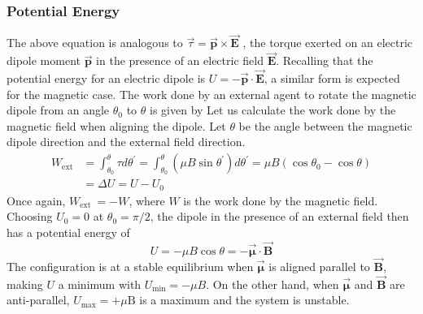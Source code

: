 \subsubsection{Potential Energy}
The above equation is analogous to $\vec{\tau}=\overrightarrow{\mathbf{p}} \times \overrightarrow{\mathbf{E}}$ , the torque exerted on an electric dipole moment $\overrightarrow{\mathbf{p}}$ in the presence of an electric field $\overrightarrow{\mathbf{E}}$. Recalling that the potential energy for an electric dipole is $U=-\overrightarrow{\mathbf{p}} \cdot \overrightarrow{\mathbf{E}}$, a similar form is expected for the magnetic case. The work done by an external agent to rotate the magnetic dipole from an angle $\theta_{0}$ to $\theta$ is given by
Let us calculate the work done by the magnetic field when aligning the dipole. Let $\theta$ be the angle between the magnetic dipole direction and the external field direction.\\
\begin{align*}
	W_{\mathrm{ext}} &=\int_{\theta_{0}}^{\theta} \tau d \theta^{\prime}=\int_{\theta_{0}}^{\theta}\left(\mu B \sin \theta^{\prime}\right) d \theta^{\prime}=\mu B\left(\cos \theta_{0}-\cos \theta\right) \\
	&=\Delta U=U-U_{0}
\end{align*}
Once again, $W_{\text {ext }}=-W$, where $W$ is the work done by the magnetic field. Choosing $U_{0}=0$ at $\theta_{0}=\pi / 2$, the dipole in the presence of an external field then has a potential energy of
$$
U=-\mu B \cos \theta=-\overrightarrow{\boldsymbol{\mu}} \cdot \overrightarrow{\mathbf{B}}
$$
The configuration is at a stable equilibrium when $\overrightarrow{\boldsymbol{\mu}}$ is aligned parallel to $\overrightarrow{\mathbf{B}}$, making $U$ a minimum with $U_{\min }=-\mu B$. On the other hand, when $\overrightarrow{\boldsymbol{\mu}}$ and $\overrightarrow{\mathbf{B}}$ are anti-parallel, $U_{\max }=+\mu \mathrm{B}$ is a maximum and the system is unstable.
\begin{center}
\end{center}
